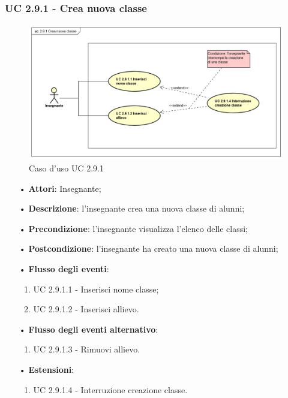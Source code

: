 \subsubsection{UC 2.9.1 - Crea nuova classe}
\begin{figure}[H]
	\centering
	\includegraphics[width=17cm]{img/Crea_nuova_classe.png} 
	\caption{Caso d'uso UC 2.9.1}
\end{figure}

\begin{itemize}
	\item[•] \textbf{Attori}: Insegnante;
	\item[•] \textbf{Descrizione}: l'insegnante crea una nuova classe di alunni;
	\item[•] \textbf{Precondizione}: l'insegnante visualizza l'elenco delle classi;
	\item[•] \textbf{Postcondizione}: l'insegnante ha creato una nuova classe di alunni;
	\item[•] \textbf{Flusso degli eventi}:
	\begin{enumerate}
		\item UC 2.9.1.1 - Inserisci nome classe;
		\item UC 2.9.1.2 - Inserisci allievo.
	\end{enumerate}
	\item[•] \textbf{Flusso degli eventi alternativo}:
	\begin{enumerate}
		\item UC 2.9.1.3 - Rimuovi allievo.
	\end{enumerate}
	\item[•] \textbf{Estensioni}:	
	\begin{enumerate}
		\item UC 2.9.1.4 - Interruzione creazione classe.
	\end{enumerate}
	 
\end{itemize}

